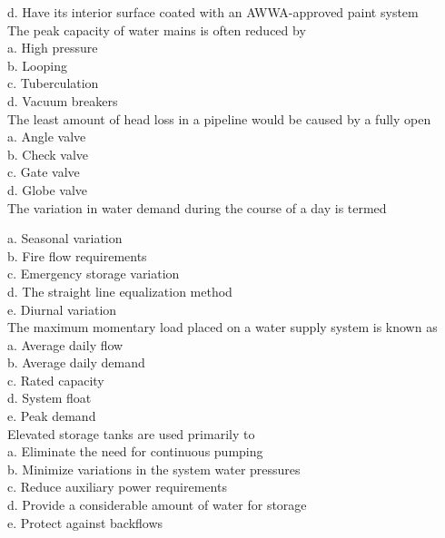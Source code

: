 d. Have its interior surface coated with an AWWA-approved paint system\\

The peak capacity of water mains is often reduced by\\

a. High pressure\\

b. Looping\\

c. Tuberculation\\

d. Vacuum breakers\\

The least amount of head loss in a pipeline would be caused by a fully open\\
a. Angle valve\\
b. Check valve\\
c. Gate valve\\
d. Globe valve\\

  The variation in water demand during the course of a day is termed


a. Seasonal variation\\

b. Fire flow requirements\\

c. Emergency storage variation\\

d. The straight line equalization method\\

e. Diurnal variation\\

  The maximum momentary load placed on a water supply system is known as\\
a. Average daily flow\\
b. Average daily demand\\
c. Rated capacity\\
d. System float\\
e. Peak demand\\

Elevated storage tanks are used primarily to\\
a. Eliminate the need for continuous pumping\\
b. Minimize variations in the system water pressures\\
c. Reduce auxiliary power requirements\\
d. Provide a considerable amount of water for storage\\
e. Protect against backflows

